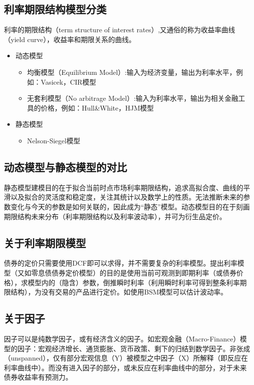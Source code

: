 \documentclass[11pt]{article}
\begin{document}
\subsection{利率期限结构模型分类}

利率的期限结构（term structure of interest rates）,又通俗的称为收益率曲线（yield curve），收益率和期限关系的曲线。
\begin{itemize}
    \item 动态模型
    \begin{itemize}
        \item 均衡模型（Equilibrium Model）:输入为经济变量，输出为利率水平，例如：Vasicek，CIR模型
        \item 无套利模型（No arbitrage Model）:输入为利率水平，输出为相关金融工具的价格，例如：Hull\&White，HJM模型
    \end{itemize}
    \item 静态模型
    \begin{itemize}
        \item Nelson-Siegel模型
    \end{itemize}
\end{itemize}

\subsection{动态模型与静态模型的对比}

静态模型建模目的在于拟合当前时点市场利率期限结构，追求高拟合度、曲线的平滑以及拟合的灵活度和稳定度，关注其统计以及数学上的性质。无法推断未来的参数变化与今天的参数是如何关联的，因此成为“静态”模型。动态模型目的在于刻画期限结构未来分布（利率期限结构以及利率波动率），并可为衍生品定价。 

\subsection{关于利率期限模型}

债券的定价只需要使用DCF即可以求得，并不需要复杂的利率模型。提出利率模型（又如零息债债券定价模型）的目的是使用当前可观测到即期利率（或债券价格），求模型内的（隐含）参数，倒推瞬时利率（利用瞬时利率可得到整条利率期限结构），为没有交易的产品进行定价。如使用BSM模型可以估计波动率。

\subsection{关于因子}

因子可以是纯数学因子，或有经济含义的因子。如宏观金融（Macro-Finance）模型的因子：宏观经济增长、通货膨胀、货币政策、剩下的归结到数学因子。非张成（unspanned），仅有部分宏观信息（Y）被模型之中因子（X）所解释（即反应在利率曲线中）。而没有进入因子的部分，或未反应在利率曲线中的部分，对于未来债券收益率有预测力。
\end{document}
